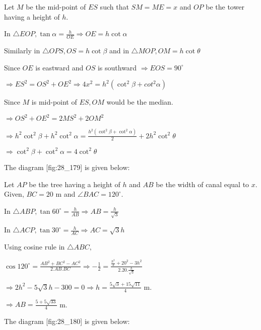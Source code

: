   \startplacefigure[reference=fig:28_178]
    \externalfigure[28_178.pdf]
  \stopplacefigure

  Let $M$ be the mid-point of $ES$ such that $SM = ME = x$ and $OP$ be the tower
  having a height of $h$.

  In $\triangle EOP, \tan\alpha = \frac{h}{OE} \Rightarrow OE = h\cot\alpha$

  Similarly in $\triangle OPS, OS = h\cot\beta$ and in $\triangle MOP, OM = h\cot\theta$

  Since $OE$ is eastward and $OS$ is southward $\Rightarrow EOS = 90^\circ$

  $\Rightarrow ES^2 = OS^2 + OE^2 \Rightarrow 4x^2 = h^2(\cot^2\beta + cot^2\alpha)$

  Since $M$ is mid-point of $ES, OM$ would be the median.

  $\Rightarrow OS^2 + OE^2 = 2MS^2 + 2OM^2$

  $\Rightarrow h^2\cot^2\beta + h^2\cot^2\alpha = \frac{h^2(\cot^2\beta + \cot^2\alpha)}{2} +
  2h^2\cot^2\theta$

  $\Rightarrow \cot^2\beta + \cot^2\alpha = 4\cot^2\theta$

\item The diagram [fig:28_179] is given below:

  \startplacefigure[reference=fig:28_179]
    \externalfigure[28_179.pdf]
  \stopplacefigure

  Let $AP$ be the tree having a height of $h$ and $AB$ be the width of canal equal to
  $x$. Given, $BC = 20$ m and $\angle BAC = 120^\circ$.

  In $\triangle ABP, \tan60^\circ = \frac{h}{AB} \Rightarrow AB = \frac{h}{\sqrt{3}}$

  In $\triangle ACP, \tan30^\circ = \frac{h}{AC}\Rightarrow AC = \sqrt{3}h$

  Using cosine rule in $\triangle ABC,$

  $\cos120^\circ = \frac{AB^2 + BC^2 - AC^2}{2.AB.BC}\Rightarrow -\frac{1}{2} = \frac{\frac{h^2}{3}
    + 20^2 - 3h^2}{2.20.\frac{h}{\sqrt{3}}}$

  $\Rightarrow 2h^2 - 5\sqrt{3}h - 300 = 0\Rightarrow h = \frac{5\sqrt{3} + 15\sqrt{11}}{4}$ m.

  $\Rightarrow AB = \frac{5 + 5\sqrt{33}}{4}$ m.

\item The diagram [fig:28_180] is given below:

  \startplacefigure[reference=fig:28_180]
    \externalfigure[28_180.pdf]
  \stopplacefigure

